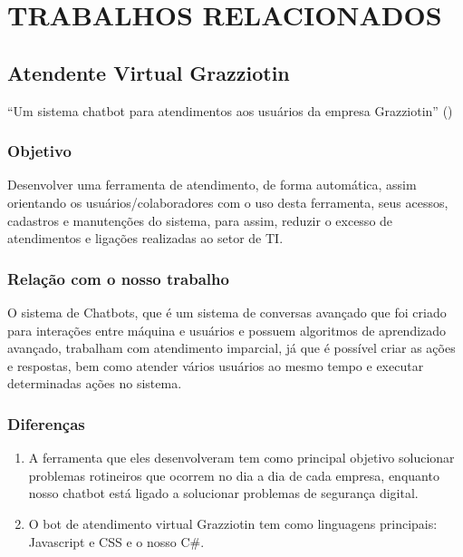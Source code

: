 \chapter{\uppercase{Trabalhos Relacionados}}
\label{TrabalhosRelacionados}

\section{Atendente Virtual Grazziotin}
    
    \begin{center}
        “Um sistema chatbot para atendimentos aos usuários da empresa Grazziotin” (\cite{Grazziotin})
    \end{center}
    
    \subsection{Objetivo}
        Desenvolver uma ferramenta de atendimento, de forma automática, assim orientando os usuários/colaboradores com o uso desta ferramenta, seus acessos, cadastros e manutenções do sistema, para assim, reduzir o excesso de atendimentos e ligações realizadas ao setor de TI.
        
    \subsection{Relação com o nosso trabalho}
        O sistema de Chatbots, que é um sistema de conversas avançado que foi criado para interações entre máquina e usuários e possuem algoritmos de aprendizado avançado, trabalham com atendimento imparcial, já que é possível criar as ações e respostas, bem como atender vários usuários ao mesmo tempo e executar determinadas ações no sistema.
    
    \subsection{Diferenças}
        \begin{enumerate}
            \item 
                A ferramenta que eles desenvolveram tem como principal objetivo solucionar problemas rotineiros que ocorrem no dia a dia de cada empresa, enquanto nosso chatbot está ligado a solucionar problemas de segurança digital.
            \item
                O bot de atendimento virtual Grazziotin tem como linguagens principais: Javascript e CSS e o nosso C\#.
        \end{enumerate}
    
